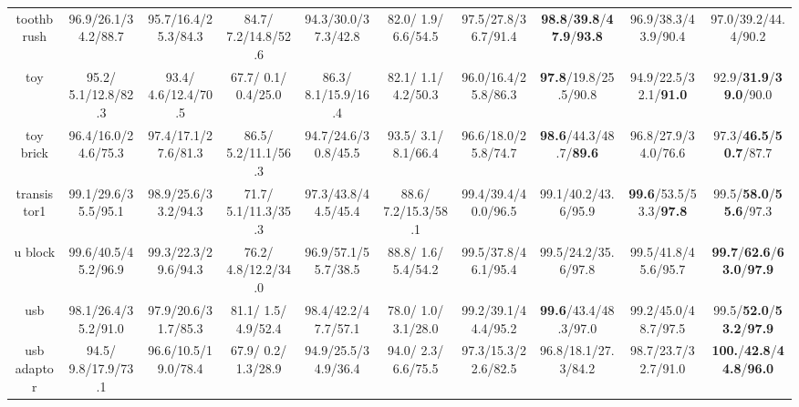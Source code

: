 \documentclass{article}
\theoremstyle{plain}
\theoremstyle{definition}
\theoremstyle{remark}
\begin{document}
\begin{table}[p]
{\begin{tabular}{ccccccccc>{\columncolor{oursblue}}c}
\cellcolor{rowgray} toothbrush & \cellcolor{rowgray} 96.9/26.1/34.2/88.7 & \cellcolor{rowgray} 95.7/16.4/25.3/84.3 & \cellcolor{rowgray} 84.7/ 7.2/14.8/52.6 & \cellcolor{rowgray} 94.3/30.0/37.3/42.8 & \cellcolor{rowgray} 82.0/ 1.9/ 6.6/54.5 & \cellcolor{rowgray} 97.5/27.8/36.7/91.4 & \cellcolor{rowgray} \textbf{98.8}/\textbf{39.8}/\textbf{47.9}/\textbf{93.8} & \cellcolor{rowgray} 96.9/38.3/43.9/90.4 & 97.0/39.2/44.4/90.2 \\
toy              & 95.2/ 5.1/12.8/82.3 & 93.4/ 4.6/12.4/70.5 & 67.7/ 0.1/ 0.4/25.0 & 86.3/ 8.1/15.9/16.4 & 82.1/ 1.1/ 4.2/50.3 & 96.0/16.4/25.8/86.3 & \textbf{97.8}/19.8/25.5/90.8 & 94.9/22.5/32.1/\textbf{91.0} & 92.9/\textbf{31.9}/\textbf{39.0}/90.0 \\
\cellcolor{rowgray} toy brick & \cellcolor{rowgray} 96.4/16.0/24.6/75.3 & \cellcolor{rowgray} 97.4/17.1/27.6/81.3 & \cellcolor{rowgray} 86.5/ 5.2/11.1/56.3 & \cellcolor{rowgray} 94.7/24.6/30.8/45.5 & \cellcolor{rowgray} 93.5/ 3.1/ 8.1/66.4 & \cellcolor{rowgray} 96.6/18.0/25.8/74.7 & \cellcolor{rowgray} \textbf{98.6}/44.3/48.7/\textbf{89.6} & \cellcolor{rowgray} 96.8/27.9/34.0/76.6 & 97.3/\textbf{46.5}/\textbf{50.7}/87.7 \\
transistor1      & 99.1/29.6/35.5/95.1 & 98.9/25.6/33.2/94.3 & 71.7/ 5.1/11.3/35.3 & 97.3/43.8/44.5/45.4 & 88.6/ 7.2/15.3/58.1 & 99.4/39.4/40.0/96.5 & 99.1/40.2/43.6/95.9 & \textbf{99.6}/53.5/53.3/\textbf{97.8} & 99.5/\textbf{58.0}/\textbf{55.6}/97.3 \\
\cellcolor{rowgray} u block & \cellcolor{rowgray} 99.6/40.5/45.2/96.9 & \cellcolor{rowgray} 99.3/22.3/29.6/94.3 & \cellcolor{rowgray} 76.2/ 4.8/12.2/34.0 & \cellcolor{rowgray} 96.9/57.1/55.7/38.5 & \cellcolor{rowgray} 88.8/ 1.6/ 5.4/54.2 & \cellcolor{rowgray} 99.5/37.8/46.1/95.4 & \cellcolor{rowgray} 99.5/24.2/35.6/97.8 & \cellcolor{rowgray} 99.5/41.8/45.6/95.7 & \textbf{99.7}/\textbf{62.6}/\textbf{63.0}/\textbf{97.9} \\
usb              & 98.1/26.4/35.2/91.0 & 97.9/20.6/31.7/85.3 & 81.1/ 1.5/ 4.9/52.4 & 98.4/42.2/47.7/57.1 & 78.0/ 1.0/ 3.1/28.0 & 99.2/39.1/44.4/95.2 & \textbf{99.6}/43.4/48.3/97.0 & 99.2/45.0/48.7/97.5 & 99.5/\textbf{52.0}/\textbf{53.2}/\textbf{97.9} \\
\cellcolor{rowgray} usb adaptor & \cellcolor{rowgray} 94.5/ 9.8/17.9/73.1 & \cellcolor{rowgray} 96.6/10.5/19.0/78.4 & \cellcolor{rowgray} 67.9/ 0.2/ 1.3/28.9 & \cellcolor{rowgray} 94.9/25.5/34.9/36.4 & \cellcolor{rowgray} 94.0/ 2.3/ 6.6/75.5 & \cellcolor{rowgray} 97.3/15.3/22.6/82.5 & \cellcolor{rowgray} 96.8/18.1/27.3/84.2 & \cellcolor{rowgray} 98.7/23.7/32.7/91.0 & \textbf{100.}/\textbf{42.8}/\textbf{44.8}/\textbf{96.0} \\

\end{tabular}}
\end{table}
\end{document}
